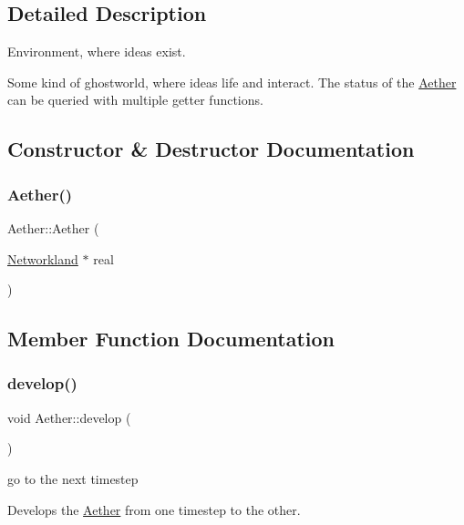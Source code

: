 \subsection{Detailed Description}
Environment, where ideas exist. 

Some kind of ghostworld, where ideas life and interact. The status of the \hyperlink{classAether}{Aether} can be queried with multiple getter functions. 

\subsection{Constructor \& Destructor Documentation}
\mbox{\label{classAether_adb65b2b9dec23ddd4b29c2cbe364b764}} 
\subsubsection{\texorpdfstring{Aether()}{Aether()}}
{\footnotesize\ttfamily Aether\+::\+Aether (\begin{DoxyParamCaption}\item[{\hyperlink{classNetworkland}{Networkland} $\ast$}]{real }\end{DoxyParamCaption})}



\subsection{Member Function Documentation}
\mbox{\label{classAether_aa26ea89dc9dc145479f8c2065121e76d}} 
\subsubsection{\texorpdfstring{develop()}{develop()}}
{\footnotesize\ttfamily void Aether\+::develop (\begin{DoxyParamCaption}{ }\end{DoxyParamCaption})}



go to the next timestep 

Develops the \hyperlink{classAether}{Aether} from one timestep to the other. \mbox{\label{classAether_a4203453890988736ebce82be4f51a965}} 
